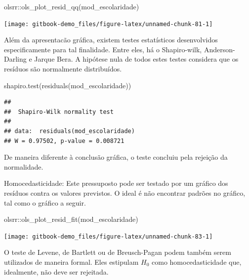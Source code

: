 \documentclass[
]{book}
\newenvironment{Shaded}{\begin{snugshade}}{\end{snugshade}}
\newcommand{\FunctionTok}[1]{\textcolor[rgb]{0.00,0.00,0.00}{#1}}
\newcommand{\NormalTok}[1]{#1}
\newcommand{\SpecialCharTok}[1]{\textcolor[rgb]{0.00,0.00,0.00}{#1}}
\begin{document}
\begin{Shaded}
\begin{Highlighting}[]
\NormalTok{olsrr}\SpecialCharTok{::}\FunctionTok{ols\_plot\_resid\_qq}\NormalTok{(mod\_escolaridade)}
\end{Highlighting}
\end{Shaded}

\begin{center}\texttt{[image: gitbook-demo\_files/figure-latex/unnamed-chunk-81-1]} \end{center}

Além da apresentacão gráfica, existem testes estatísticos desenvolvidos especificamente para tal finalidade. Entre eles, há o Shapiro-wilk, Anderson-Darling e Jarque Bera. A hipótese nula de todos estes testes considera que os resíduos são normalmente distribuídos.

\begin{Shaded}
\begin{Highlighting}[]
\FunctionTok{shapiro.test}\NormalTok{(}\FunctionTok{residuals}\NormalTok{(mod\_escolaridade))}
\end{Highlighting}
\end{Shaded}

\begin{verbatim}
## 
##  Shapiro-Wilk normality test
## 
## data:  residuals(mod_escolaridade)
## W = 0.97502, p-value = 0.008721
\end{verbatim}

De maneira diferente à conclusão gráfica, o teste concluiu pela rejeição da normalidade.

Homocedasticidade: Este pressuposto pode ser testado por um gráfico dos resíduos contra os valores previstos. O ideal é não encontrar padrões no gráfico, tal como o gráfico a seguir.

\begin{Shaded}
\begin{Highlighting}[]
\NormalTok{olsrr}\SpecialCharTok{::}\FunctionTok{ols\_plot\_resid\_fit}\NormalTok{(mod\_escolaridade)}
\end{Highlighting}
\end{Shaded}

\begin{center}\texttt{[image: gitbook-demo\_files/figure-latex/unnamed-chunk-83-1]} \end{center}

O teste de Levene, de Bartlett ou de Breusch-Pagan podem também serem utilizados de maneira formal. Eles estipulam \(H_0\) como homocedasticidade que, idealmente, não deve ser rejeitada.
\end{document}
